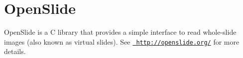 \chapter{Open\+Slide}
\hypertarget{index}{}\label{index}
Open\+Slide is a C library that provides a simple interface to read whole-\/slide images (also known as virtual slides). See \href{http://openslide.org/}{\texttt{ http\+://openslide.\+org/}} for more details. 
